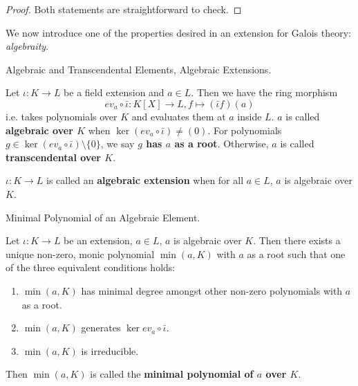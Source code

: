 \documentclass[../book.tex]{subfiles}
\begin{document}
\begin{proof} Both statements are straightforward to check. 
\end{proof}
We now introduce one of the properties desired 
in an extension for Galois theory: \emph{algebraity}.
\begin{dfn} Algebraic and Transcendental Elements, Algebraic Extensions.

    Let $\iota : K \to L$ be a field extension and $a \in L$. 
    Then we have the ring morphism \[
        ev_a \circ \bar\iota : K[X] \to L, 
        f \mapsto (\bar\iota f)(a) 
    \]
    i.e. takes polynomials over $K$ and evaluates them at $a$ inside $L$.
    $a$ is called \textbf{algebraic over $K$} when 
    $\ker (ev_a \circ \bar\iota) \neq (0)$.
    For polynomials $g \in \ker (ev_a \circ \bar\iota)\setminus \{0\}$, 
    we say \textbf{$g$ has $a$ as a root}. 
    Otherwise, $a$ is called \textbf{transcendental over $K$}. 
    
    $\iota : K \to L$ is called an \textbf{algebraic extension}
    when for all $a \in L$, $a$ is algebraic over $K$.
\end{dfn}
\begin{dfn} Minimal Polynomial of an Algebraic Element. 

Let $\iota : K \to L$ be an extension, $a \in L$, $a$ is algebraic over $K$. 
Then there exists a unique non-zero, monic polynomial $\min(a,K)$ 
with $a$ as a root such that one of the three equivalent conditions holds:
\begin{enumerate}
    \item $\min(a,K)$ has minimal degree amongst other 
        non-zero polynomials with $a$ as a root.
    \item $\min(a,K)$ generates $\ker ev_{a} \circ \bar{\iota}$. 
    \item $\min(a,K)$ is irreducible. 
\end{enumerate}
Then $\min(a,K)$ is called the \textbf{minimal polynomial of $a$ over $K$}. 
\end{dfn}
\end{document}
